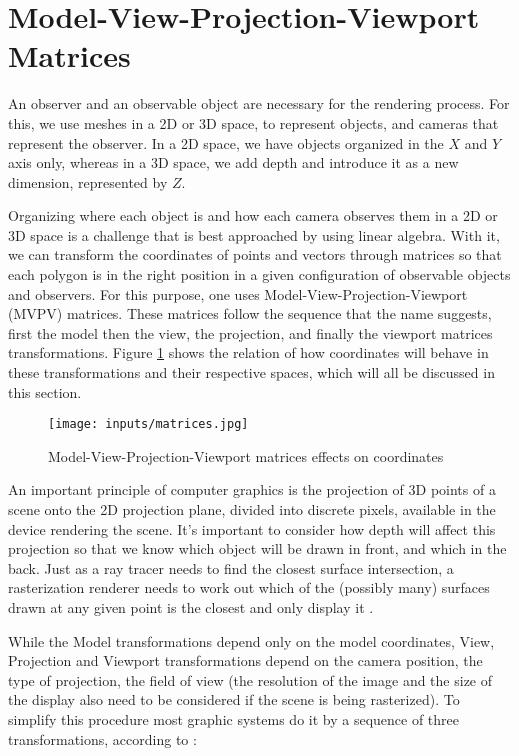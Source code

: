 \documentclass[cic,tc,english]{iiufrgs}
\begin{document}

\section{Model-View-Projection-Viewport Matrices}
\label{mvpvmatricessection}
An observer and an observable object are necessary for the rendering process. For this, we use meshes in a 2D or 3D space, to represent objects, and cameras that represent the observer. In a 2D space, we have objects organized in the $X$ and $Y$ axis only, whereas in a 3D space, we add depth and introduce it as a new dimension, represented by $Z$.

Organizing where each object is and how each camera observes them in a 2D or 3D space is a challenge that is best approached by using linear algebra. With it, we can transform the coordinates of points and vectors through matrices so that each polygon is in the right position in a given configuration of observable objects and observers. For this purpose, one uses Model-View-Projection-Viewport (MVPV) matrices. These matrices follow the sequence that the name suggests, first the model then the view, the projection, and finally the viewport matrices transformations. Figure \ref{mvpvmatrices} shows the relation of how coordinates will behave in these transformations and their respective spaces, which will all be discussed in this section.

\begin{figure}[hbt!]
    \caption{Model-View-Projection-Viewport matrices effects on coordinates}
    \begin{center}
        \texttt{[image: inputs/matrices.jpg]}
    \end{center}
    \label{mvpvmatrices}
\end{figure}

An important principle of computer graphics is the projection of 3D points of a scene onto the 2D projection plane, divided into discrete pixels, available in the device rendering the scene. It's important to consider how depth will affect this projection so that we know which object will be drawn in front, and which in the back. Just as a ray tracer needs to find the closest surface intersection, a rasterization renderer needs to work out which of the (possibly many) surfaces drawn at any given point is the closest and only display it \cite{Marschner2021CGFundamentals}.

While the Model transformations depend only on the model coordinates, View, Projection and Viewport transformations depend on the camera position, the type of projection, the field of view (the resolution of the image and the size of the display also need to be considered if the scene is being rasterized). To simplify this procedure most graphic systems do it by a sequence of three transformations, according to \citet{Marschner2021CGFundamentals}:
\end{document}
